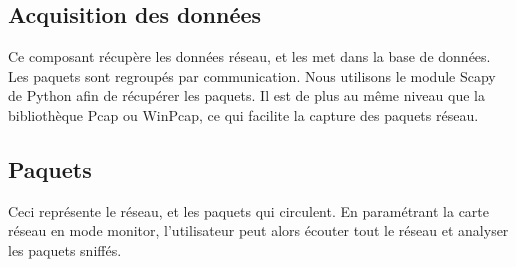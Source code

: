 \subsection{Acquisition des données}
Ce composant récupère les données réseau, et les met dans la base de données. Les paquets sont regroupés par communication.
Nous utilisons le module Scapy de Python afin de récupérer les paquets. Il est de plus au même niveau que la bibliothèque Pcap ou WinPcap, ce qui facilite la capture des paquets réseau.

\subsection{Paquets}
Ceci représente le réseau, et les paquets qui circulent. En paramétrant la carte réseau en mode monitor, l'utilisateur peut alors écouter tout le réseau et analyser les paquets sniffés.


